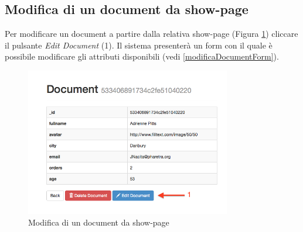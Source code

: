 	\clearpage
	\subsection{Modifica di un document da show-page} %
	\label{modificadocumentdashowpage}

			Per modificare un document a partire dalla relativa show-page (Figura \ref{fig:modificadocumentdashowpage}) cliccare il pulsante \emph{Edit Document} (1). Il sistema presenterà un form con il quale è possibile modificare gli attributi disponibili (vedi \ref{modificaDocumentForm}).

				\begin{figure}[H]
					\centering \includegraphics[width=0.8\textwidth]{img/modificadocumentdashowpage.png}
				\caption{\label{fig:modificadocumentdashowpage} Modifica di un document da show-page}
				\end{figure}
	
	\clearpage
